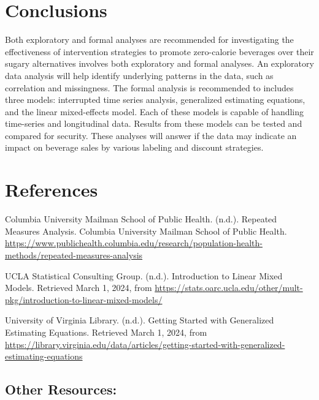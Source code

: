 \documentclass[
]{article}
\begin{document}
\hypertarget{conclusions}{%
\section{Conclusions}\label{conclusions}}

Both exploratory and formal analyses are recommended for investigating the effectiveness of intervention strategies to promote zero-calorie beverages over their sugary alternatives involves both exploratory and formal analyses. An exploratory data analysis will help identify underlying patterns in the data, such as correlation and missingness. The formal analysis is recommended to includes three models: interrupted time series analysis, generalized estimating equations, and the linear mixed-effects model. Each of these models is capable of handling time-series and longitudinal data. Results from these models can be tested and compared for security. These analyses will answer if the data may indicate an impact on beverage sales by various labeling and discount strategies.

\pagebreak

\hypertarget{references}{%
\section{References}\label{references}}

Columbia University Mailman School of Public Health. (n.d.). Repeated Measures Analysis. Columbia University Mailman School of Public Health. \url{https://www.publichealth.columbia.edu/research/population-health-methods/repeated-measures-analysis}

UCLA Statistical Consulting Group. (n.d.). Introduction to Linear Mixed Models. Retrieved March 1, 2024, from \url{https://stats.oarc.ucla.edu/other/mult-pkg/introduction-to-linear-mixed-models/}

University of Virginia Library. (n.d.). Getting Started with Generalized Estimating Equations. Retrieved March 1, 2024, from \url{https://library.virginia.edu/data/articles/getting-started-with-generalized-estimating-equations}

\hypertarget{other-resources}{%
\subsection{Other Resources:}\label{other-resources}}
\end{document}

